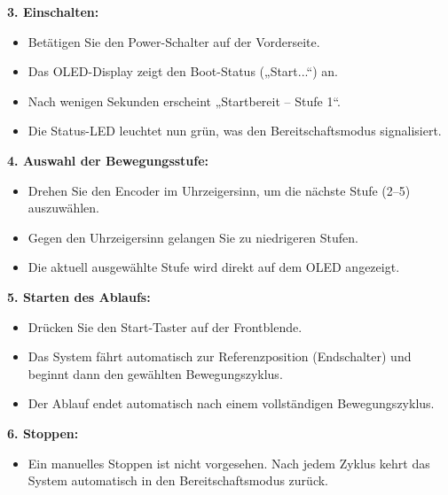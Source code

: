 \documentclass[a4paper,12pt]{report}
\begin{document}
		
		
		\noindent\textbf{3. Einschalten:}
		
		\begin{itemize}[leftmargin=1.5em]
		\item Betätigen Sie den Power-Schalter auf der Vorderseite. 
		\item Das OLED-Display zeigt den Boot-Status („Start...“) an. 
		\item Nach wenigen Sekunden erscheint „Startbereit – Stufe 1“. 
		\item Die Status-LED leuchtet nun grün, was den Bereitschaftsmodus signalisiert. \\
    	\end{itemize}
		
		\noindent\textbf{4. Auswahl der Bewegungsstufe:}
		\begin{itemize}[leftmargin=1.5em]
		
		\item Drehen Sie den Encoder im Uhrzeigersinn, um die nächste Stufe (2–5) auszuwählen. 
		\item Gegen den Uhrzeigersinn gelangen Sie zu niedrigeren Stufen. 
		\item Die aktuell ausgewählte Stufe wird direkt auf dem OLED angezeigt. \\
    	\end{itemize}
		
		\noindent\textbf{5. Starten des Ablaufs:}
		\begin{itemize}[leftmargin=1.5em]
		
		\item Drücken Sie den Start-Taster auf der Frontblende. 
		\item Das System fährt automatisch zur Referenzposition (Endschalter) und beginnt dann den gewählten Bewegungszyklus. 
		\item Der Ablauf endet automatisch nach einem vollständigen Bewegungszyklus. \\
    	\end{itemize}
		
		\noindent\textbf{6. Stoppen:}
		\begin{itemize}[leftmargin=1.5em]
		
		\item Ein manuelles Stoppen ist nicht vorgesehen. Nach jedem Zyklus kehrt das System automatisch in den Bereitschaftsmodus zurück. \\
		
    	\end{itemize}
    \newpage
	
\end{document}
